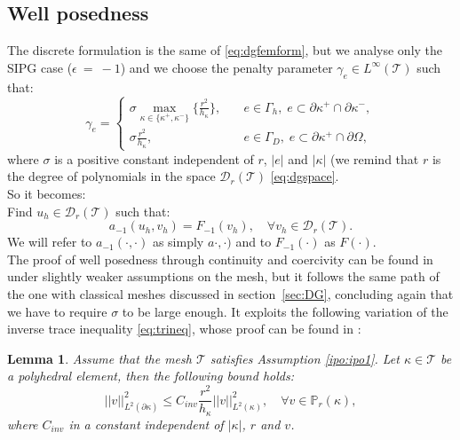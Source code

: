 \documentclass[12pt, a4paper]{article}
\theoremstyle{definition}
\theoremstyle{plain}
\newtheorem{lemma}{Lemma}
\theoremstyle{plain}
\begin{document}
\subsection{Well posedness}
The discrete formulation is the same of \eqref{eq:dgfemform}, but we analyse only the SIPG case ($\epsilon~=~-1$) and we choose the penalty parameter $\gamma_e \in L^\infty(\mathcal{T})$ such that:
\begin{equation*}
	\gamma_e =
	\begin{cases}
		\sigma \max\limits_{\kappa \in \{\kappa^+, \kappa^-\}} \big\{ \frac{r^2}{h_\kappa}\big\},
		& \quad e \in \Gamma_h, \; e \subset \partial\kappa^+ \cap \partial\kappa^-,\\
		\sigma\frac{r^2}{h_\kappa},& \quad e \in \Gamma_D, \; e \subset \partial\kappa^+ \cap \partial\Omega,
	\end{cases}
\end{equation*}
where $\sigma$ is a positive constant independent of $r$, $|e|$ and $|\kappa|$ (we remind that $r$ is the degree of polynomials in the space $\mathcal{D}_r(\mathcal{T})$ \eqref{eq:dgspace}.\\
So it becomes:\\
Find $u_h \in \mathcal{D}_r(\mathcal{T})$ such that:
\begin{equation} \label{eq:dgfempolyform}
	a_{-1}(u_h, v_h) = F_{-1}(v_h), \quad \forall v_h \in \mathcal{D}_r(\mathcal{T}).
\end{equation}
We will refer to $a_{-1}(\cdot, \cdot)$ as simply $a\cdot, \cdot)$ and to $F_{-1}(\cdot)$ as $F(\cdot)$.\\
The proof of well posedness through continuity and coercivity can be found in \cite{hpmet} under slightly weaker assumptions on the mesh, but it follows the same path of the one with classical meshes discussed in section~\ref{sec:DG}, concluding again that we have to require $\sigma$ to be large enough. It exploits the following variation of the inverse trace inequality \eqref{eq:trineq}, whose proof can be found in \cite{multigrid}:
\begin{lemma}
	Assume that the mesh $\mathcal{T}$ satisfies Assumption \ref{ipo:ipo1}. Let $\kappa \in \mathcal{T}$ be a polyhedral element, then the following bound holds:
	\begin{equation*}
		|\!|v|\!|^2_{L^2(\partial\kappa)} \leq C_{inv} \frac{r^2}{h_\kappa} |\!|v|\!|^2_{L^2(\kappa)}, \quad \forall v \in \mathbb{P}_r(\kappa),
	\end{equation*}
	where $C_{inv}$ in a constant independent of $|\kappa|$, $r$ and $v$.
\end{lemma}
\end{document}
